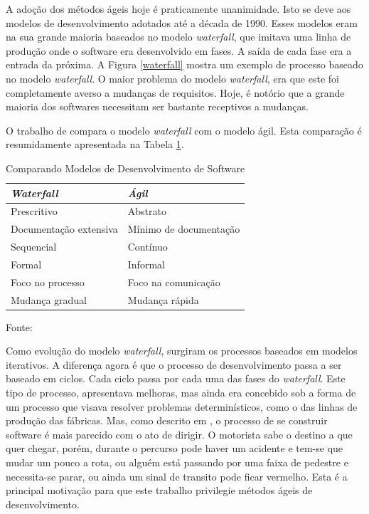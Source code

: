 A adoção dos métodos ágeis hoje é praticamente unanimidade. 
Isto se deve aos modelos de desenvolvimento adotados até a década de 1990. 
Esses modelos eram na sua grande maioria baseados no modelo \emph{waterfall}, que imitava uma linha de produção onde o software era desenvolvido em fases. 
A saída de cada fase era a entrada da próxima. 
A Figura \ref{waterfall} mostra um exemplo de processo baseado no modelo \emph{waterfall}.
O maior problema do modelo \emph{waterfall}, era que este foi completamente averso a mudanças de requisitos. 
Hoje, é notório que a grande maioria dos softwares necessitam ser bastante receptivos a mudanças.

O trabalho de  compara o modelo \emph{waterfall} com o modelo ágil. 
Esta comparação é resumidamente apresentada na Tabela \ref{waterfall_x_agil}.

\begin{table}[H]
	\caption{Comparando Modelos de Desenvolvimento de Software}
	\label{waterfall_x_agil}
	\ABNTEXfontereduzida
	\begin{tabular}{p{8cm}p{8cm}}
	\toprule
	\textit{Waterfall} & \textit{Ágil}\\
	\midrule
	\ABNTEXfontereduzida
	Prescritivo & Abstrato\\
	Documentação extensiva & Mínimo de documentação\\
	Sequencial & Contínuo\\
	Formal & Informal\\
	Foco no processo & Foco na comunicação\\
	Mudança gradual & Mudança rápida\\
	\bottomrule
	\end{tabular}
	\footnotesize Fonte:
\end{table}

Como evolução do modelo \emph{waterfall}, surgiram os processos baseados em modelos iterativos. 
A diferença agora é que o processo de desenvolvimento passa a ser baseado em ciclos. 
Cada ciclo passa por cada uma das fases do \emph{waterfall}. 
Este tipo de processo, apresentava melhoras, mas ainda era concebido sob a forma de um processo que visava resolver problemas determinísticos, como o das linhas de produção das fábricas.
Mas, como descrito em , o processo de se construir software é mais parecido com o ato de dirigir.
O motorista sabe o destino a que quer chegar, porém, durante o percurso pode haver um acidente e tem-se que mudar um pouco a rota, ou alguém está passando por uma faixa de pedestre e necessita-se parar, ou ainda um sinal de transito pode ficar vermelho. 
Esta é a principal motivação para que este trabalho privilegie métodos ágeis de desenvolvimento.


